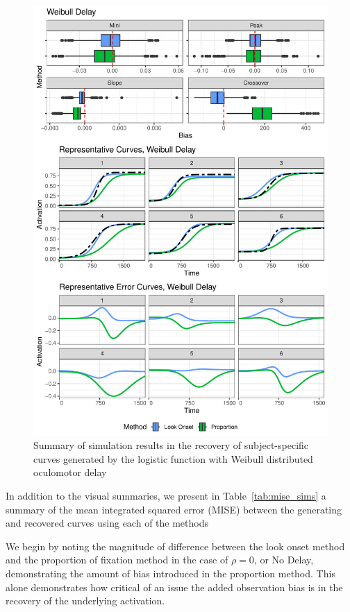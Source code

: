 \documentclass{article}
\begin{document}
\begin{figure}[H]
\centering
\includegraphics{rep_and_diff_weibull_delay.pdf}
\caption{Summary of simulation results in the recovery of subject-specific curves generated by the logistic function with Weibull distributed oculomotor delay}
\label{fig:panel_weibull_delay}
\end{figure}



In addition to the visual summaries, we present in Table~\ref{tab:mise_sims} a summary of the mean integrated squared error (MISE) between the generating and recovered curves using each of the methods

We begin by noting the  magnitude of difference between the look onset method and the proportion of fixation method in the case of $\rho = 0$, or No Delay, demonstrating the amount of bias introduced in the proportion method. This alone demonstrates how critical of an issue the added observation bias is in the recovery of the underlying activation.
\end{document}
